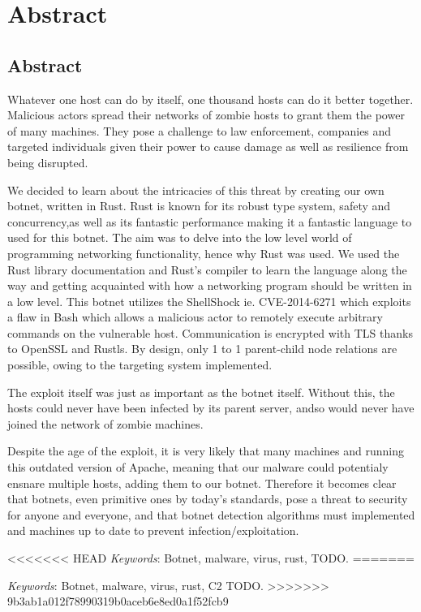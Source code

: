 \documentclass[../main.tex]{subfiles}
\begin{document}
    \newpage

	\chapter*{Abstract}

    \section*{Abstract}

Whatever one host can do by itself, one thousand hosts can do it better together. Malicious actors spread their networks of zombie hosts to grant them the power of many machines.
They pose a challenge to law enforcement, companies and targeted individuals given their power to cause damage as well as resilience from being disrupted.

We decided to learn about the intricacies of this threat by creating our own botnet, written in Rust. Rust is known for its robust type system, safety and concurrency,as well as its
fantastic performance making it a fantastic language to used for this botnet.
The aim was to delve into the low level world of programming networking functionality, hence why Rust was used. We used the Rust library documentation and Rust's compiler to learn
the language along the way and getting acquainted with how a networking program should be written in a low level.
This botnet utilizes the ShellShock ie. CVE-2014-6271 which exploits a flaw in Bash which allows a malicious actor to remotely execute arbitrary commands on the vulnerable host.
Communication is encrypted with TLS thanks to OpenSSL and Rustls. By design, only 1 to 1 parent-child node relations are possible, owing to the targeting system implemented.

The exploit itself was just as important as the botnet itself. Without this, the hosts could never have been infected by its parent server, andso would never have joined the network
of zombie machines.

Despite the age of the exploit, it is very likely that many machines and running this outdated version of Apache, meaning that our malware could potentialy ensnare multiple hosts,
adding them to our botnet. Therefore it becomes clear that botnets, even primitive ones by today's standards, pose a threat to security for anyone and everyone, and that botnet
detection algorithms must implemented and machines up to date to prevent infection/exploitation.


<<<<<<< HEAD
	\qquad \textit{Keywords}: Botnet, malware, virus, rust, TODO.
=======

	\qquad \textit{Keywords}: Botnet, malware, virus, rust, C2 TODO.
>>>>>>> 9b3ab1a012f78990319b0aceb6e8ed0a1f52fcb9


	\vspace{10pt}
\end{document}
